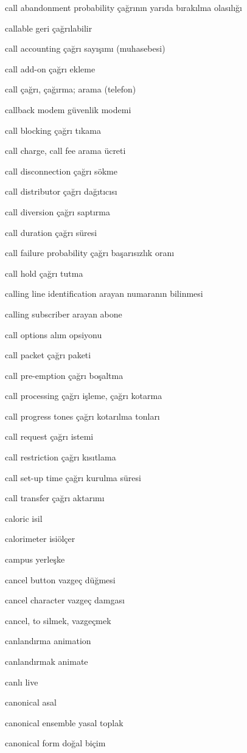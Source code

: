 \documentclass[12pt,fleqn]{article}\usepackage{../../common}
\begin{document}
call abandonment probability çağrının yarıda bırakılma olasılığı

callable geri çağrılabilir

call accounting çağrı sayışımı (muhasebesi)

call add-on çağrı ekleme

call çağrı, çağırma; arama (telefon)

callback modem güvenlik modemi

call blocking çağrı tıkama

call charge, call fee arama ücreti

call disconnection çağrı sökme

call distributor çağrı dağıtıcısı

call diversion çağrı saptırma

call duration çağrı süresi

call failure probability çağrı başarısızlık oranı

call hold çağrı tutma

calling line identification arayan numaranın bilinmesi

calling subscriber arayan abone

call options alım opsiyonu

call packet çağrı paketi

call pre-emption çağrı boşaltma

call processing çağrı işleme, çağrı kotarma

call progress tones çağrı kotarılma tonları

call request çağrı istemi

call restriction çağrı kısıtlama

call set-up time çağrı kurulma süresi

call transfer çağrı aktarımı

caloric isil

calorimeter isiölçer

campus yerleşke

cancel button vazgeç düğmesi

cancel character vazgeç damgası

cancel, to silmek, vazgeçmek

canlandırma animation

canlandırmak animate

canlı live

canonical asal

canonical ensemble yasal toplak

canonical form doğal biçim
\end{document}
